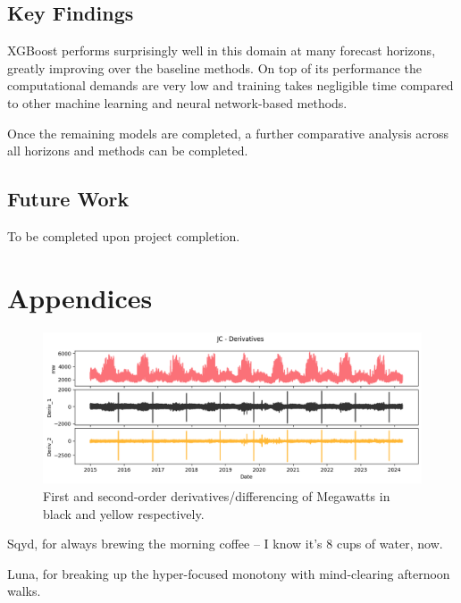 \documentclass[sigconf]{acmart}
\begin{document}
\subsection{Key Findings}
XGBoost performs surprisingly well in this domain at many forecast horizons, greatly improving over the baseline methods. On top of its performance the computational demands are very low and training takes negligible time compared to other machine learning and neural network-based methods.

Once the remaining models are completed, a further comparative analysis across all horizons and methods can be completed.
\subsection{Future Work}
To be completed upon project completion.

\section{Appendices}

  \begin{figure}[hbt!]
    \includegraphics[width=\columnwidth]{Images/Deriv_Plot.png}
    \caption{First and second-order derivatives/differencing of Megawatts in black and yellow respectively.}
    \Description{}
    \label{fig:deriv}
  \end{figure}


\begin{acks}
 \hspace{3mm} Sqyd, for always brewing the morning coffee -- I know it's 8 cups of water, now.

Luna, for breaking up the hyper-focused monotony with mind-clearing afternoon walks.
\end{acks}





\appendix
\end{document}
